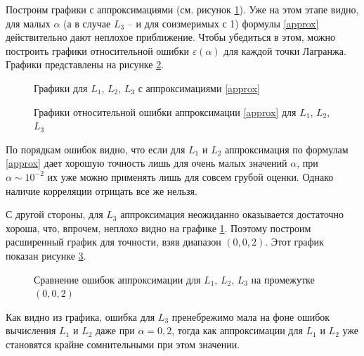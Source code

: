 \documentclass[12pt]{article}
\begin{document}
    \par Построим графики с аппроксимациями (см. рисунок \ref{subplots}). Уже на этом
    этапе видно, для малых $\alpha$ (а в случае $L_3$ -- и для соизмеримых с 1) формулы
    \ref{approx} действительно дают неплохое приближение. Чтобы убедиться в этом, можно
    построить графики относительной ошибки $\varepsilon(\alpha)$ для каждой точки
    Лагранжа. Графики представлены на рисунке \ref{errors}. 

    \begin{figure}[H]
        \centering
        
        \caption{Графики для $L_1$, $L_2$, $L_3$ с аппроксимациями \ref{approx}}
        \label{subplots}
    \end{figure}

    \begin{figure}[H]
        \centering
        
        \caption{Графики относительной ошибки аппроксимации \ref{approx} для $L_1$,
        $L_2$, $L_3$}
        \label{errors}
    \end{figure}

    \par По порядкам ошибок видно, что если для $L_1$ и $L_2$ аппроксимация по формулам 
    \ref{approx} дает хорошую точность лишь для очень малых значений $\alpha$,
    при $\alpha \sim 10^{-2}$ их уже можно применять лишь для совсем грубой оценки.
    Однако наличие корреляции отрицать все же нельзя.

    \par С другой стороны, для $L_3$ аппроксимация неожиданно оказывается достаточно 
    хороша, что, впрочем, неплохо видно на графике \ref{subplots}. Поэтому
    построим расширенный график для точности, взяв диапазон $(0, 0{,}2)$. Этот
    график показан рисунке \ref{errors_all}.

    \begin{figure}[]
        \centering
        
        \caption{Сравнение ошибок аппроксимации для $L_1$, $L_2$, $L_3$ на промежутке
        $(0, 0{,}2)$}
        \label{errors_all}
    \end{figure}

    Как видно из графика, ошибка для $L_3$ пренебрежимо мала на фоне ошибок вычисления 
    $L_1$ и $L_2$ даже при $\alpha = 0{,}2$, тогда как аппроксимации для $L_1$ и 
    $L_2$ уже становятся крайне сомнительными при этом значении.
    
\end{document}
